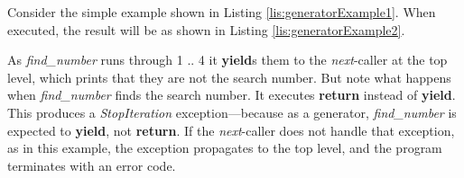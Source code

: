     


Consider the simple example shown in Listing \ref{lis:generatorExample1}. When executed, the result will be as shown in Listing \ref{lis:generatorExample2}.





As \textit{find\_number} runs through 1 .. 4 it \textbf{yield}s them to the \textit{next}-caller at the top level, which prints that they are not the search number. But note what happens when \textit{find\_number} finds the search number. It executes \textbf{return} instead of \textbf{yield}. This produces a \textit{StopIteration} exception---because as a generator, \textit{find\_number} is expected to \textbf{yield}, not \textbf{return}. If the \textit{next}-caller does not handle that exception, as in this example, the exception propagates to the top level, and the program terminates with an error code. 

